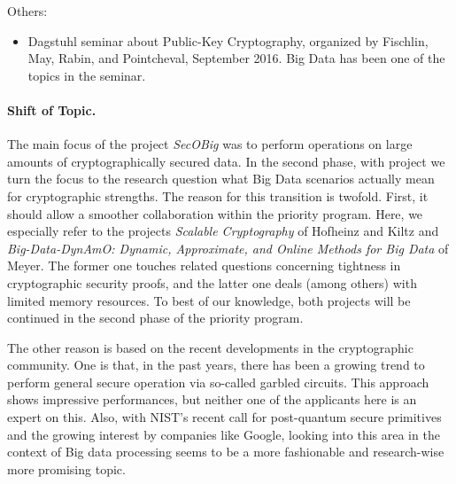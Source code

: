 \noindent
Others:
\begin{itemize}
\item Dagstuhl seminar about Public-Key Cryptography, organized by Fischlin, May, Rabin, and Pointcheval, September 2016. Big Data has been one of the topics in the seminar.
\end{itemize}


\paragraph{Shift of Topic.}
The main focus of the project \emph{SecOBig} was to perform operations on large amounts of cryptographically secured data. In the second phase, with project \emph{\memoc} we turn the focus to the research question what Big Data scenarios actually mean for cryptographic strengths. The reason for this transition is twofold. First, it should allow a smoother collaboration within the priority program. Here, we especially refer to the projects \emph{Scalable Cryptography} of Hofheinz and Kiltz and \emph{Big-Data-DynAmO: Dynamic, Approximate, and Online Methods for Big Data} of Meyer. The former one touches related questions concerning tightness in cryptographic security proofs, and the latter one deals (among others) with limited memory resources. To best of our knowledge, both projects will be continued in the second phase of the priority program.

The other reason is based on the recent developments in the cryptographic community. One is that, in the past years, there has been a growing trend to perform general secure operation via so-called garbled circuits. This approach shows impressive performances, but neither one of the applicants here is an expert on this. Also, with NIST's recent call for post-quantum secure primitives and the growing interest by companies like Google, looking into this area in the context of Big data processing seems to be a more fashionable and research-wise more promising topic.


